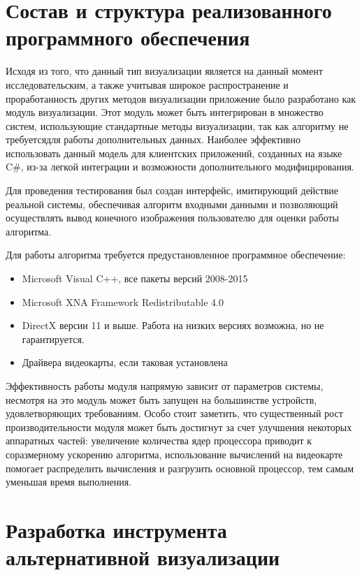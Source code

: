 \section{Состав и структура реализованного программного обеспечения}

Исходя из того, что данный тип визуализации является на данный момент исследовательским, а также учитывая широкое распространение и проработанность других методов визуализации приложение было разработано как модуль визуализации. Этот модуль может быть интегрирован в множество систем, использующие стандартные методы визуализации, так как алгоритму не требуетсядля работы дополнительных данных. Наиболее эффективно использовать данный модель для клиентских приложений, созданных на языке C\#, из-за легкой интеграции и возможности дополнительного модифицирования.

Для проведения тестирования был создан интерфейс, имитирующий действие реальной системы, обеспечивая алгоритм входными данными и позволяющий осуществлять вывод конечного изображения пользователю для оценки работы алгоритма.

Для работы алгоритма требуется предустановленное программное обеспечение:

\begin{itemize}
	\item Microsoft Visual C++, все пакеты версий 2008-2015
	\item Microsoft XNA Framework Redistributable 4.0
	\item DirectX версии 11 и выше. Работа на низких версиях возможна, но не гарантируется.
	\item Драйвера видеокарты, если таковая установлена
\end{itemize}

Эффективность работы модуля напрямую зависит от параметров системы, несмотря на это модуль может быть запущен на большинстве устройств, удовлетворяющих требованиям. Особо стоит заметить, что существенный рост производительности модуля может быть достигнут за счет улучшения некоторых аппаратных частей: увеличение количества ядер процессора приводит к соразмерному ускорению алгоритма, использование вычислений на видеокарте помогает распределить вычисления и разгрузить основной процессор, тем самым уменьшая время выполнения.



\section{Разработка инструмента альтернативной визуализации}

